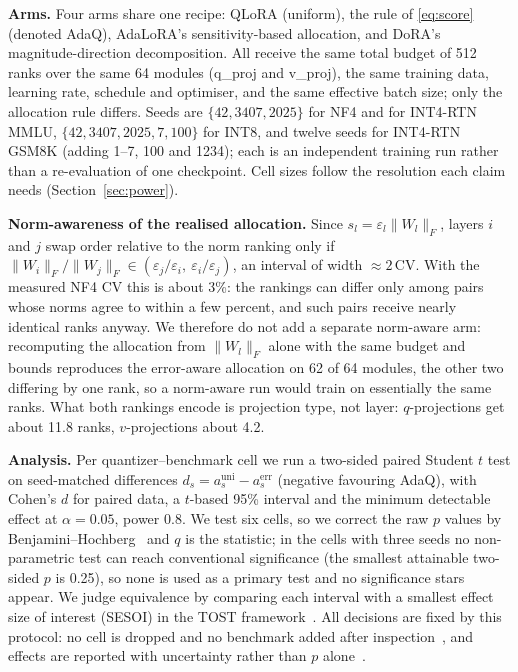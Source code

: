 \documentclass[preprint,12pt]{elsarticle}
\begin{document}
\textbf{Arms.} Four arms share one recipe: QLoRA (uniform), the rule of \eqref{eq:score} (denoted AdaQ), AdaLoRA's sensitivity-based allocation, and DoRA's magnitude-direction decomposition. All receive the same total budget of 512 ranks over the same 64 modules (q\_proj and v\_proj), the same training data, learning rate, schedule and optimiser, and the same effective batch size; only the allocation rule differs. Seeds are $\{42,3407,2025\}$ for NF4 and for INT4-RTN MMLU, $\{42,3407,2025,7,100\}$ for INT8, and twelve seeds for INT4-RTN GSM8K (adding 1--7, 100 and 1234); each is an independent training run rather than a re-evaluation of one checkpoint. Cell sizes follow the resolution each claim needs (Section~\ref{sec:power}).

\textbf{Norm-awareness of the realised allocation.} Since $s_l = \varepsilon_l\|W_l\|_F$, layers $i$ and $j$ swap order relative to the norm ranking only if $\|W_i\|_F/\|W_j\|_F \in (\varepsilon_j/\varepsilon_i,\ \varepsilon_i/\varepsilon_j)$, an interval of width $\approx 2\,\mathrm{CV}$. With the measured NF4 CV this is about 3\%: the rankings can differ only among pairs whose norms agree to within a few percent, and such pairs receive nearly identical ranks anyway. We therefore do not add a separate norm-aware arm: recomputing the allocation from $\|W_l\|_F$ alone with the same budget and bounds reproduces the error-aware allocation on 62 of 64 modules, the other two differing by one rank, so a norm-aware run would train on essentially the same ranks. What both rankings encode is projection type, not layer: $q$-projections get about 11.8 ranks, $v$-projections about 4.2.

\textbf{Analysis.} Per quantizer--benchmark cell we run a two-sided paired Student $t$ test on seed-matched differences $d_s = a^{\mathrm{uni}}_s - a^{\mathrm{err}}_s$ (negative favouring AdaQ), with Cohen's $d$ for paired data, a $t$-based 95\% interval and the minimum detectable effect at $\alpha = 0.05$, power $0.8$. We test six cells, so we correct the raw $p$ values by Benjamini--Hochberg~\citep{benjamini1995fdr} and $q$ is the statistic; in the cells with three seeds no non-parametric test can reach conventional significance (the smallest attainable two-sided $p$ is 0.25), so none is used as a primary test and no significance stars appear. We judge equivalence by comparing each interval with a smallest effect size of interest (SESOI) in the TOST framework~\citep{lakens2018equivalence}. All decisions are fixed by this protocol: no cell is dropped and no benchmark added after inspection~\citep{simmons2011falsepositive,kerr1998harking}, and effects are reported with uncertainty rather than $p$ alone~\citep{wasserstein2016asa}.
\end{document}
